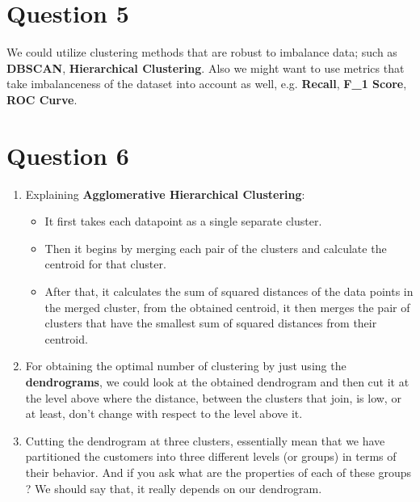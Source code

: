 \documentclass[a4paper,12pt]{article}
\begin{document}
\section*{Question 5}
We could utilize clustering methods that are robust to imbalance data; such as \textbf{DBSCAN}, \textbf{Hierarchical Clustering}. Also we might want to use metrics that take imbalanceness of the dataset into account as well, e.g. \textbf{Recall}, \textbf{F\_1 Score}, \textbf{ROC Curve}.

\section*{Question 6}
\begin{enumerate}[label=(\alph*)]
  \item Explaining \textbf{Agglomerative Hierarchical Clustering}:
  \begin{itemize}
    \item It first takes each datapoint as a single separate cluster.
    \item Then it begins by merging each pair of the clusters and calculate the centroid for that cluster. 
    \item After that, it calculates the sum of squared distances of the data points in the merged cluster, from the obtained centroid, it then merges the pair of clusters that have the smallest sum of squared distances from their centroid.
  \end{itemize}
  \item For obtaining the optimal number of clustering by just using the \textbf{dendrograms}, we could look at the obtained dendrogram and then cut it at the level above where the distance, between the clusters that join, is low, or at least, don't change with respect to the level above it.
  \item Cutting the dendrogram at three clusters, essentially mean that we have partitioned the customers into three different levels (or groups) in terms of their behavior. And if you ask what are the properties of each of these groups ?
  We should say that, it really depends on our dendrogram.
\end{enumerate}
\end{document}

